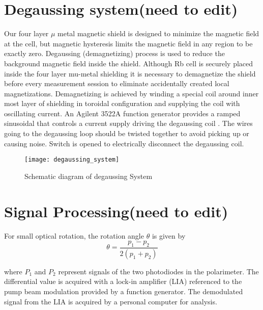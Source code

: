 \documentclass[12pt]{report}
\begin{document}
\section{Degaussing system(need to edit)}
Our four layer $\mu$ metal magnetic shield is designed to minimize the magnetic field at the cell, but
magnetic hysteresis limits the magnetic field in any region to be exactly zero. Degaussing (demagnetizing) process is used to reduce the background magnetic field inside the shield. Although Rb cell is securely placed inside the four layer mu-metal shielding it is necessary to demagnetize the shield before every measurement session  to eliminate accidentally created local magnetizations.
Demagnetizing is achieved by winding a special coil around inner most layer of shielding  in toroidal configuration
and supplying the coil with oscillating current. An Agilent 3522A function generator  provides a ramped sinusoidal that controls a current supply driving the degaussing coil \cite{Martin:2014foa}. The wires going to the degaussing loop should be twisted together to avoid picking up or causing noise. Switch is opened to electrically disconnect the degaussing coil.
 
\begin{figure}[h]
\centering
\texttt{[image: degaussing\_system]}
\caption{Schematic diagram of degaussing System}
\end{figure}

\section{Signal Processing(need to edit)}
For small optical rotation, the rotation angle $\theta$ is given by 
\begin{equation}
\theta=\frac{p_1-p_2}{2(p_1+p_2)}
\end{equation}
       
where $P_1$ and $P_2$ represent signals of the two photodiodes in the polarimeter. The differential value is acquired with a lock-in amplifier (LIA) referenced to the pump beam modulation provided by a function generator. The demodulated signal from the LIA is acquired by a personal computer for analysis. 
\end{document}
